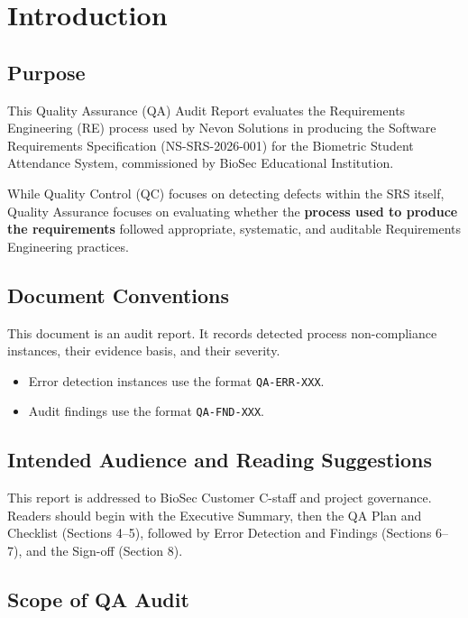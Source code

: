 \documentclass[11pt,a4paper]{article}
\begin{document}
\section{Introduction}

\subsection{Purpose}

This Quality Assurance (QA) Audit Report evaluates the Requirements Engineering (RE) process used by Nevon Solutions in producing the Software Requirements Specification (NS-SRS-2026-001) for the Biometric Student Attendance System, commissioned by BioSec Educational Institution.

While Quality Control (QC) focuses on detecting defects within the SRS itself, Quality Assurance focuses on evaluating whether the \textbf{process used to produce the requirements} followed appropriate, systematic, and auditable Requirements Engineering practices.

\subsection{Document Conventions}

This document is an audit report. It records detected process non-compliance instances, their evidence basis, and their severity.

\begin{itemize}[leftmargin=*]
\item Error detection instances use the format \texttt{QA-ERR-XXX}.
\item Audit findings use the format \texttt{QA-FND-XXX}.
\end{itemize}

\subsection{Intended Audience and Reading Suggestions}

This report is addressed to BioSec Customer C-staff and project governance. Readers should begin with the Executive Summary, then the QA Plan and Checklist (Sections 4--5), followed by Error Detection and Findings (Sections 6--7), and the Sign-off (Section 8).

\subsection{Scope of QA Audit}
\end{document}
